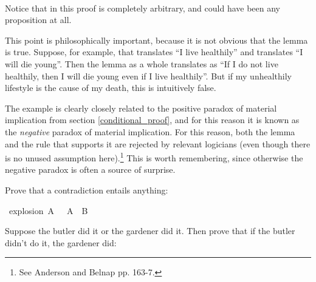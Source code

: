 \begin{isabellebody}
\ \ \isamarkupfalse%
\isanewline
{}\isamarkupfalse%
%
\endisatagproof
{\isafoldproof}%
%
\isadelimproof
%
\endisadelimproof
%
\begin{isamarkuptext}%
Notice that  in this proof is completely arbitrary, and could have been any
proposition at all.%
\end{isamarkuptext}\isamarkuptrue%
%
\begin{isamarkuptext}%
This point is philosophically important, because it is not obvious that the lemma is true.
Suppose, for example, that  translates ``I live healthily'' and  translates ``I
will die young''. Then the lemma as a whole translates as ``If I do not live healthily, then I will
die young even if I live healthily''. But if my unhealthily lifestyle is the cause of my death,
this is intuitively false.%
\end{isamarkuptext}\isamarkuptrue%
%
\begin{isamarkuptext}%
The example is clearly closely related to the positive paradox of material implication from
section \ref{conditional_proof}, and for this reason it is known as the \emph{negative} paradox of
material implication. For this reason, both the lemma and the rule that supports it are rejected by
relevant logicians (even though there is no unused assumption here).\footnote{See Anderson and Belnap
\cite{anderson_entailment_1976} pp. 163-7.}
This is worth remembering, since otherwise the negative paradox is often a source of surprise.%
\end{isamarkuptext}\isamarkuptrue%
%
\begin{isamarkuptext}%
\begin{Exercise} Prove that a contradiction entails anything: \end{Exercise}%
\end{isamarkuptext}\isamarkuptrue%
\isamarkupfalse%
\ explosion{\isacharcolon}\ {\isachardoublequoteopen}A\ {\isasymand}\ {\isasymnot}\ A\ {\isasymlongrightarrow}\ B{\isachardoublequoteclose}%
\isadelimproof
\ %
\endisadelimproof
%
\isatagproof
{}\isamarkupfalse%
%
\endisatagproof
{\isafoldproof}%
%
\isadelimproof
%
\endisadelimproof
%
\begin{isamarkuptext}%
\begin{Exercise} Suppose the butler did it or the gardener did it. Then prove that if the butler didn't do it, 
the gardener did: \end{Exercise}%
\end{isamarkuptext}\isamarkuptrue%

\end{isabellebody}

